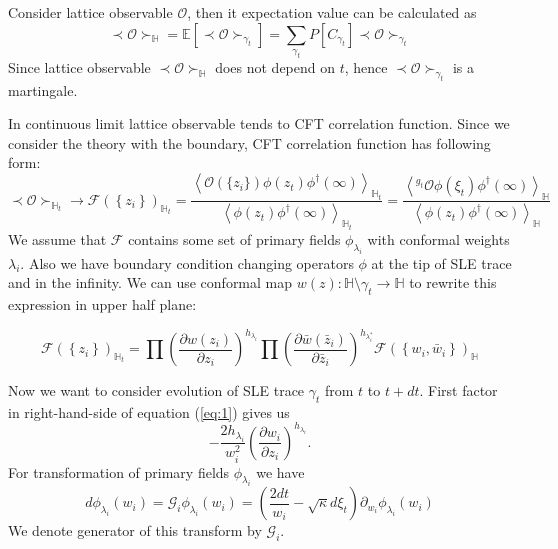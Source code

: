 \documentclass[12pt]{article}
\theoremstyle{definition}
\theoremstyle{definition} \newtheorem{Def}{Definition}
\begin{document}
Consider lattice observable $\mathcal{O}$, then it expectation value can be calculated as
\begin{equation*}
  \prec \mathcal{O} \succ_{\mathbb{H}}=\mathbb{E}\left[\prec\mathcal{O}\succ_{\gamma_{t}}\right]=\sum_{\gamma_{t}} P\left[C_{\gamma_{t}}\right] \prec \mathcal{O} \succ_{\gamma_{t}}
\end{equation*}
Since lattice observable  $\prec \mathcal{O} \succ_{\mathbb{H}}$ does not depend on $t$, hence $\prec\mathcal{O}\succ_{\gamma_{t}}$ is a martingale.

In continuous limit lattice observable tends to CFT correlation function. Since we consider the theory with the boundary, CFT correlation function has following form:
\begin{equation*}
  \prec \mathcal{O} \succ_{\mathbb{H}_{t}}\to \mathcal{F}(\left\{z_{i}\right\})_{\mathbb{H}_{t}}=
  \frac{\left< \mathcal{O}(\{z_{i}\})\phi(z_{t})\phi^{\dagger}(\infty)\right>_{\mathbb{H}_{t}}}{\left<\phi(z_{t})\phi^{\dagger}(\infty)\right>_{\mathbb{H}_{t}}}=
  \frac{\left< ^{g_{t}}\mathcal{O}\phi(\xi_{t})\phi^{\dagger}(\infty)\right>_{\mathbb{H}}}{\left<\phi(z_{t})\phi^{\dagger}(\infty)\right>_{\mathbb{H}}}
\end{equation*}
We assume that $\mathcal{F}$ contains some set of primary fields $\phi_{\lambda_{i}}$ with conformal weights $\lambda_{i}$. Also we have boundary condition changing operators  $\phi$ at the tip of SLE trace and in the infinity.  We can use conformal map  $w(z):\mathbb{H}\setminus\gamma_{t}\to \mathbb{H}$ to rewrite this expression in upper half plane:

\begin{equation}
  \mathcal{F}(\left\{z_{i}\right\})_{\mathbb{H}_{t}}=\prod \left(\frac{\partial w(z_{i})}{\partial z_{i}}\right)^{h_{\lambda_i}} 
  \prod \left(\frac{\partial \bar w(\bar z_{i})}{\partial \bar z_{i}}\right)^{h_{\lambda^{*}_i}}
  \mathcal{F}(\left\{w_{i}, \bar w_{i}\right\})_{\mathbb{H}}
  \label{eq:1}
\end{equation}

Now we want to consider evolution of SLE trace $\gamma_{t}$ from  $t$ to $t+ dt$. First factor in right-hand-side of equation (\ref{eq:1}) gives us
\begin{equation*}
  -\frac{2h_{\lambda_{i}}}{w_{i}^{2}}\left(\frac{\partial w_{i}}{\partial z_{i}}\right)^{h_{\lambda_{i}}}.
\end{equation*}
For transformation of primary fields $\phi_{\lambda_{i}}$ we have 
\begin{equation}
  \label{eq:2}
  d\phi_{\lambda_{i}}(w_{i}) = \mathcal{G}_{i}\phi_{\lambda_{i}}(w_{i})=\left(\frac{2dt}{w_{i}}-\sqrt{\kappa} d\xi_{t}\right) \partial_{w_{i}}\phi_{\lambda_{i}}(w_{i}) 
\end{equation}
We denote generator of this transform by $\mathcal{G}_{i}$.
\end{document}
